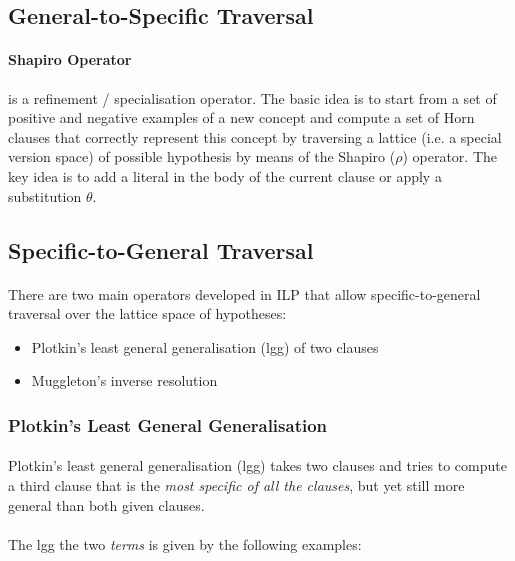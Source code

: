 \documentclass{article}
\theoremstyle{plain}
\theoremstyle{definition}
\begin{document}
\begin{multicols}{2}
\subsection{General-to-Specific Traversal}

\paragraph{Shapiro Operator} is a refinement / specialisation operator. The basic idea is to start from a set of positive and negative examples of a new concept and compute a set of Horn clauses that correctly represent this concept by traversing a lattice (i.e. a special version space) of possible hypothesis by means of the Shapiro ($\rho$) operator. The key idea is to add a literal in the body of the current clause or apply a substitution $\theta$.

\subsection{Specific-to-General Traversal}

\paragraph{} There are two main operators developed in ILP that allow specific-to-general traversal over the lattice space of hypotheses:

\begin{itemize}
\item Plotkin's least general generalisation (lgg) of two clauses
\item Muggleton's inverse resolution
\end{itemize}

\subsubsection{Plotkin's Least General Generalisation}

\paragraph{} Plotkin's least general generalisation (lgg)\cite{plotkin70} takes two clauses and tries to compute a third clause that is the \textit{most specific of all the clauses}, but yet still more general than both given clauses.

\paragraph{} The lgg the two \textit{terms} is given by the following examples:


\end{multicols}
\end{document}
